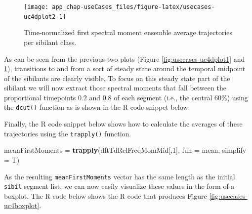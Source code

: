 \documentclass[]{book}
\newenvironment{Shaded}{\begin{snugshade}}{\end{snugshade}}
\newcommand{\CommentTok}[1]{\textcolor[rgb]{0.56,0.35,0.01}{\textit{#1}}}
\newcommand{\DataTypeTok}[1]{\textcolor[rgb]{0.13,0.29,0.53}{#1}}
\newcommand{\DecValTok}[1]{\textcolor[rgb]{0.00,0.00,0.81}{#1}}
\newcommand{\FloatTok}[1]{\textcolor[rgb]{0.00,0.00,0.81}{#1}}
\newcommand{\KeywordTok}[1]{\textcolor[rgb]{0.13,0.29,0.53}{\textbf{#1}}}
\newcommand{\NormalTok}[1]{#1}
\newcommand{\StringTok}[1]{\textcolor[rgb]{0.31,0.60,0.02}{#1}}
\begin{document}
\begin{figure}

{\centering \texttt{[image: app\_chap-useCases\_files/figure-latex/usecases-uc4dplot2-1]} 

}

\caption{Time-normalized first spectral moment ensemble average trajectories per sibilant class.}\label{fig:usecases-uc4dplot2}
\end{figure}

As can be seen from the previous two plots (Figure \ref{fig:usecases-uc4dplot1} and \ref{fig:usecases-uc4dplot2}), transitions to and from a sort of steady state around the temporal midpoint of the sibilants are clearly visible. To focus on this steady state part of the sibilant we will now extract those spectral moments that fall between the proportional timepoints 0.2 and 0.8 of each segment (i.e., the central 60\%) using the \texttt{dcut()} function as is shown in the R code snippet below.

\begin{Shaded}
\end{Shaded}

Finally, the R code snippet below shows how to calculate the averages of these trajectories using the \texttt{trapply()} function.

\begin{Shaded}
\begin{Highlighting}[]
\NormalTok{meanFirstMoments =}\StringTok{ }\KeywordTok{trapply}\NormalTok{(dftTdRelFreqMomMid[,}\DecValTok{1}\NormalTok{],}
                           \DataTypeTok{fun =}\NormalTok{ mean,}
                           \DataTypeTok{simplify =}\NormalTok{ T)}
\end{Highlighting}
\end{Shaded}

As the resulting \texttt{meanFirstMoments} vector has the same length as the initial \texttt{sibil} segment list, we can now easily visualize these values in the form of a boxplot. The R code below shows the R code that produces Figure \ref{fig:usecases-uc4boxplot}.
\end{document}
